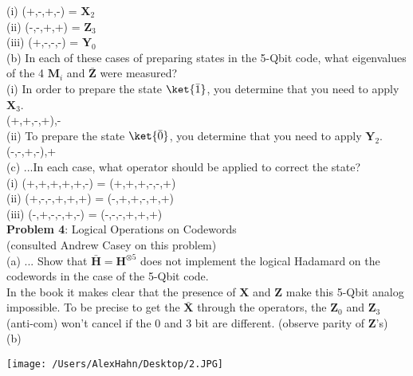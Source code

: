 (i) (+,-,+,-) = $\textbf{X}_2$\\
(ii) (-,-,+,+) = $\textbf{Z}_3$\\
(iii) (+,-,-,-) = $\textbf{Y}_0$\\

(b) In each of these cases of preparing states in the 5-Qbit code, what
eigenvalues of
the 4 $\textbf{M}_i$ and $\bar{\textbf{Z}}$ were measured?\\
(i) In order to prepare the state $\ket{\bar{1}}$, you determine that you need
to apply $\textbf{X}_3$.\\

(+,+,-,+),-\\

(ii) To prepare the state $\ket{\bar{0}}$, you determine that you need to apply
$\textbf{Y}_2$.\\

(-,-,+,-),+\\


(c) ...In each case, what operator should be applied to correct the state?\\

(i) (+,+,+,+,+,-) = (+,+,+,-,-,+)\\

(ii) (+,-,-,+,+,+) = (-,+,+,-,+,+)\\

(iii) (-,+,-,-,+,-) = (-,-,-,+,+,+)\\

\textbf{Problem 4}: Logical Operations on Codewords\\
(consulted Andrew Casey on this problem)\\

(a) ... Show that $\bar{\textbf{H}}=\textbf{H}^{\otimes5}$ does not
implement the logical Hadamard on the codewords in the case of the 5-Qbit
code.\\

In the book it makes clear that the presence of $\textbf{X}$ and
$\textbf{Z}$ make this 5-Qbit analog impossible. To be precise to get  the
$\bar{\textbf{X}}$ through the operators, the $\textbf{Z}_0$ and
$\textbf{Z}_3$ (anti-com) won't cancel if the 0 and 3 bit are
different. (observe parity of $\textbf{Z}$'s)\\


(b)

\begin{center}
\texttt{[image: /Users/AlexHahn/Desktop/2.JPG]}
\end{center}

